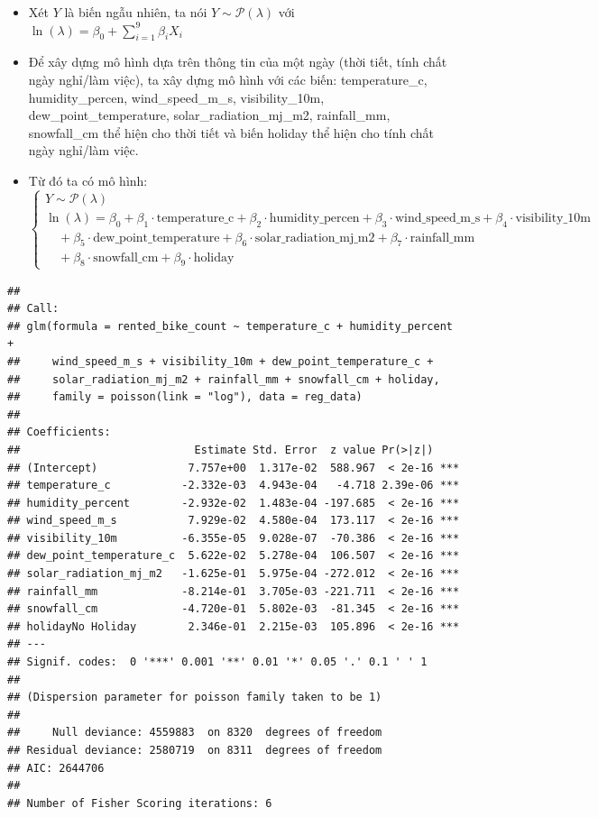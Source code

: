 \documentclass[
  11pt,
  letterpaper,
]{article}
\begin{document}
\begin{itemize}
    \item Xét $Y$ là biến ngẫu nhiên, ta nói $Y \sim \mathcal{P}(\lambda)$ với \\
    $\ln(\lambda) = \beta_0 + \sum_{i=1}^{9} \beta_i X_i$

    \item Để xây dựng mô hình dựa trên thông tin của một ngày (thời tiết, tính chất ngày nghỉ/làm việc), ta xây dựng mô hình với các biến: temperature\_c, humidity\_percen, wind\_speed\_m\_s, visibility\_10m, dew\_point\_temperature, solar\_radiation\_mj\_m2, rainfall\_mm, snowfall\_cm thể hiện cho thời tiết và biến holiday thể hiện cho tính chất ngày nghỉ/làm việc.

    \item Từ đó ta có mô hình:
    \begin{equation*}
    \begin{cases}
        Y \sim \mathcal{P}(\lambda) \\
        \ln(\lambda) = \beta_0 + \beta_1 \cdot \text{temperature\_c} + \beta_2 \cdot \text{humidity\_percen} + \beta_3 \cdot \text{wind\_speed\_m\_s} + \beta_4 \cdot \text{visibility\_10m} \\
        \quad + \beta_5 \cdot \text{dew\_point\_temperature} + \beta_6 \cdot \text{solar\_radiation\_mj\_m2} + \beta_7 \cdot \text{rainfall\_mm} \\
        \quad + \beta_8 \cdot \text{snowfall\_cm} + \beta_9 \cdot \text{holiday}
    \end{cases}
    \end{equation*}
\end{itemize}

\begin{verbatim}
## 
## Call:
## glm(formula = rented_bike_count ~ temperature_c + humidity_percent + 
##     wind_speed_m_s + visibility_10m + dew_point_temperature_c + 
##     solar_radiation_mj_m2 + rainfall_mm + snowfall_cm + holiday, 
##     family = poisson(link = "log"), data = reg_data)
## 
## Coefficients:
##                           Estimate Std. Error  z value Pr(>|z|)    
## (Intercept)              7.757e+00  1.317e-02  588.967  < 2e-16 ***
## temperature_c           -2.332e-03  4.943e-04   -4.718 2.39e-06 ***
## humidity_percent        -2.932e-02  1.483e-04 -197.685  < 2e-16 ***
## wind_speed_m_s           7.929e-02  4.580e-04  173.117  < 2e-16 ***
## visibility_10m          -6.355e-05  9.028e-07  -70.386  < 2e-16 ***
## dew_point_temperature_c  5.622e-02  5.278e-04  106.507  < 2e-16 ***
## solar_radiation_mj_m2   -1.625e-01  5.975e-04 -272.012  < 2e-16 ***
## rainfall_mm             -8.214e-01  3.705e-03 -221.711  < 2e-16 ***
## snowfall_cm             -4.720e-01  5.802e-03  -81.345  < 2e-16 ***
## holidayNo Holiday        2.346e-01  2.215e-03  105.896  < 2e-16 ***
## ---
## Signif. codes:  0 '***' 0.001 '**' 0.01 '*' 0.05 '.' 0.1 ' ' 1
## 
## (Dispersion parameter for poisson family taken to be 1)
## 
##     Null deviance: 4559883  on 8320  degrees of freedom
## Residual deviance: 2580719  on 8311  degrees of freedom
## AIC: 2644706
## 
## Number of Fisher Scoring iterations: 6
\end{verbatim}
\end{document}
